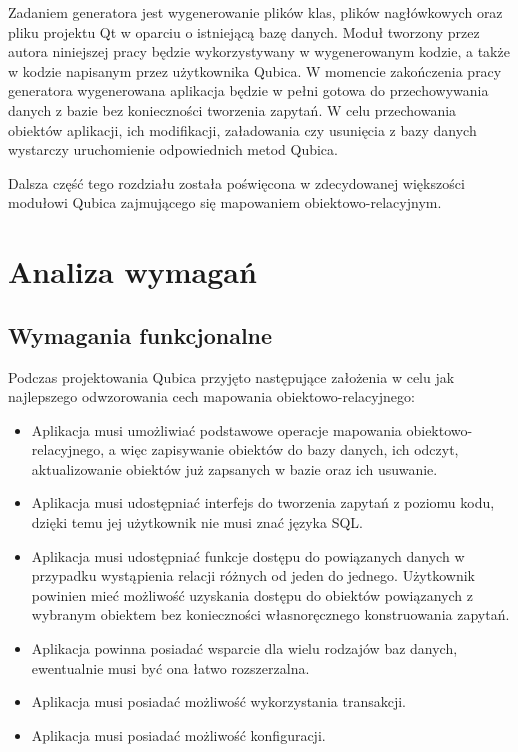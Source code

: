 \documentclass[12pt]{report}
\begin{document}
Zadaniem generatora jest wygenerowanie plików klas, plików nagłówkowych oraz pliku projektu Qt w oparciu o istniejącą bazę danych. Moduł tworzony przez autora niniejszej
pracy będzie wykorzystywany w wygenerowanym kodzie, a także w kodzie napisanym przez użytkownika Qubica. W momencie zakończenia pracy generatora wygenerowana
aplikacja będzie w pełni gotowa do przechowywania danych z bazie bez konieczności tworzenia zapytań. W celu przechowania obiektów aplikacji, ich modifikacji, załadowania 
czy usunięcia z bazy danych wystarczy uruchomienie odpowiednich metod Qubica.

Dalsza część tego rozdziału została poświęcona w zdecydowanej większości modułowi Qubica zajmującego się mapowaniem obiektowo-relacyjnym.

\section{Analiza wymagań}

\subsection{Wymagania funkcjonalne}

Podczas projektowania Qubica przyjęto następujące założenia w celu jak najlepszego odwzorowania cech mapowania obiektowo-relacyjnego:

\begin{itemize}
\item Aplikacja musi umożliwiać podstawowe operacje mapowania obiektowo-rela\-cyjnego, a więc zapisywanie obiektów do bazy danych, ich odczyt, aktualizowanie obiektów
już zapsanych w bazie oraz ich usuwanie.
\item Aplikacja musi udostępniać interfejs do tworzenia zapytań z poziomu kodu, dzięki temu jej użytkownik nie musi znać języka SQL.
\item Aplikacja musi udostępniać funkcje dostępu do powiązanych danych w przypadku wystąpienia relacji różnych od jeden do jednego. Użytkownik powinien mieć możliwość
uzyskania dostępu do obiektów powiązanych z wybranym obiektem bez konieczności własnoręcznego konstruowania zapytań.
\item Aplikacja powinna posiadać wsparcie dla wielu rodzajów baz danych, ewentualnie musi być ona łatwo rozszerzalna.
\item Aplikacja musi posiadać możliwość wykorzystania transakcji.
\item Aplikacja musi posiadać możliwość konfiguracji.
\end{itemize}
\end{document}

